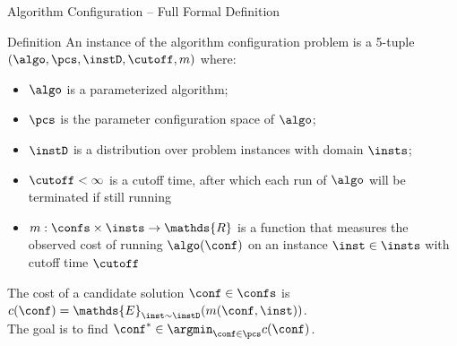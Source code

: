 \begin{frame}[c]{Algorithm Configuration -- Full Formal Definition}

\begin{block}{Definition}
An instance of the algorithm configuration problem
is a 5-tuple $(\algo, \pcs, \instD, \cutoff, m)$ where:
\begin{itemize}
	\item $\algo$ is a parameterized algorithm;
	\item $\pcs$ is the parameter configuration space of $\algo$;
	\item $\instD$ is a distribution over problem instances with domain $\insts$;
	\pause
	\item $\cutoff < \infty$ is a \alert{cutoff time}, after which each run of $\algo$ will be terminated if still running
	\pause
	\item $m: \confs \times \insts \rightarrow \mathds{R}$ is a function that
	measures the observed cost of running $\algo(\conf)$ on an instance $\inst \in
	\insts$ with cutoff time $\cutoff$ 
\end{itemize}
\pause
The cost of a candidate solution $\conf\in\confs$ is
\alert{$c(\conf) = \mathds{E}_{\inst \sim \instD} (m(\conf,\inst))$}.\\
The goal is to find \alert{$\conf^* \in \argmin_{\conf \in \pcs} c(\conf)$}.

\end{block}

\end{frame}
